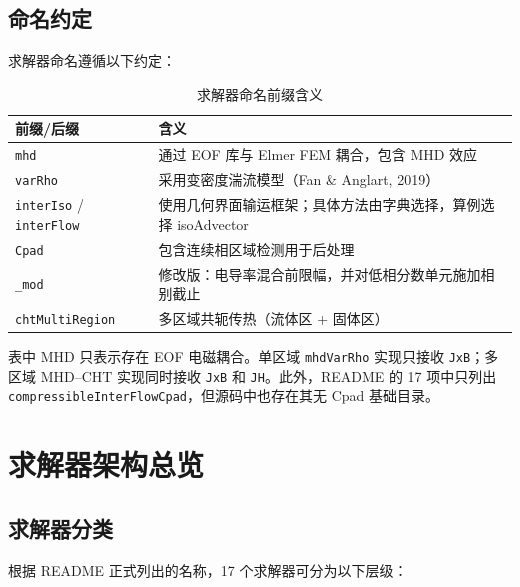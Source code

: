 \documentclass[11pt,a4paper]{article}
\begin{document}
\subsection{命名约定}

求解器命名遵循以下约定：

\begin{table}[H]
\centering
\caption{求解器命名前缀含义}
\begin{tabularx}{\textwidth}{@{}L{0.27\textwidth}X@{}}
\toprule
\textbf{前缀/后缀} & \textbf{含义} \\
\midrule
\texttt{mhd} & 通过 EOF 库与 Elmer FEM 耦合，包含 MHD 效应 \\
\texttt{varRho} & 采用变密度湍流模型（Fan \& Anglart, 2019） \\
\texttt{interIso} / \texttt{interFlow} & 使用几何界面输运框架；具体方法由字典选择，算例选择 isoAdvector \\
\texttt{Cpad} & 包含连续相区域检测用于后处理 \\
\texttt{\_mod} & 修改版：电导率混合前限幅，并对低相分数单元施加相别截止 \\
\texttt{chtMultiRegion} & 多区域共轭传热（流体区 + 固体区） \\
\bottomrule
\end{tabularx}
\end{table}

表中 MHD 只表示存在 EOF 电磁耦合。单区域 \texttt{mhdVarRho}
实现只接收 \texttt{JxB}；多区域 MHD--CHT 实现同时接收
\texttt{JxB} 和 \texttt{JH}。此外，README 的 17 项中只列出
\texttt{compressibleInterFlowCpad}，但源码中也存在其无 Cpad 基础目录。

\section{求解器架构总览}

\subsection{求解器分类}

根据 README 正式列出的名称，17 个求解器可分为以下层级：
\end{document}
